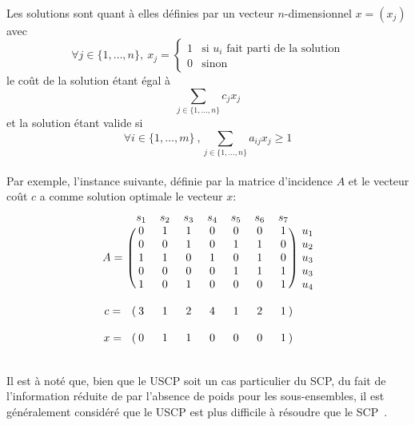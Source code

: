 \documentclass[a4paper,11pt,twoside,french,report]{../common/simplem}
\begin{document}
				\paragraph*{}
					Les solutions sont quant à elles définies par un vecteur \(n\)-dimensionnel \(x = \left(x_j\right)\) avec
					\[\forall j \in \{1,\ldots,n\},\ x_j = \left\{
						\begin{array}{ll}
							1 & \text{si } u_i \text{ fait parti de la solution}\\
							0 & \text{sinon}
						\end{array}
					\right.\]
					le coût de la solution étant égal à
					\[\sum_{j \in \{1,\ldots,n\}}{c_j x_j}\]
					et la solution étant valide si
					\[\forall i \in \{1,\ldots,m\}\ ,\sum_{j \in \{1,\ldots,n\}}{a_{ij}x_j} \ge 1\]
				\paragraph*{}
					Par exemple, l'instance suivante, définie par la matrice d'incidence \(A\) et le vecteur coût \(c\) a comme solution optimale le vecteur \(x\):
					\[
					\begin{blockarray}{ccccccccc}
						& s_1 & s_2 & s_3 & s_4 & s_5 & s_6 & s_7 \\
						\begin{block}{c(ccccccc)c}
							    & 0 & 1 & 1 & 0 & 0 & 0 & 1 & u_1\\
							    & 0 & 0 & 1 & 0 & 1 & 1 & 0 & u_2\\
							A = & 1 & 1 & 0 & 1 & 0 & 1 & 0 & u_3\\
							    & 0 & 0 & 0 & 0 & 1 & 1 & 1 & u_3\\
							    & 1 & 0 & 1 & 0 & 0 & 0 & 1 & u_4\\
						\end{block}
						\\
						\begin{block}{c(ccccccc)c}
							c = & 3 & 1 & 2 & 4 & 1 & 2 & 1 &\\
						\end{block}
						\\
						\begin{block}{c(ccccccc)c}
							x = & 0 & 1 & 1 & 0 & 0 & 0 & 1 &\\
						\end{block}
					\end{blockarray}
					\]
				\paragraph*{}
					Il est à noté que, bien que le \gls{USCP} soit un cas particulier du \gls{SCP}, du fait de l'information réduite de par l’absence de poids pour les sous-ensembles, il est généralement considéré que le \gls{USCP} est plus difficile à résoudre que le \gls{SCP}~\cite{Yelbay2015}.
\end{document}
